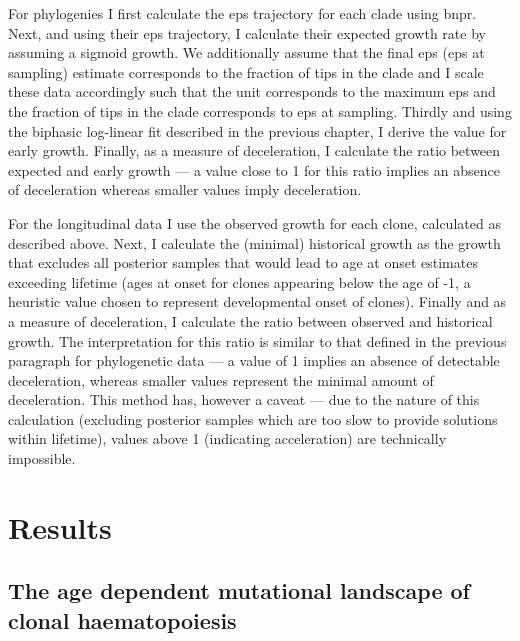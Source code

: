 For phylogenies I first calculate the \ac{eps} trajectory for each clade using \ac{bnpr}. Next, and using their \ac{eps} trajectory, I calculate their expected growth rate by assuming a sigmoid growth. We additionally assume that the final \ac{eps} (\ac{eps} at sampling) estimate corresponds to the fraction of tips in the clade and I scale these data accordingly such that the unit corresponds to the maximum \ac{eps} and the fraction of tips in the clade corresponds to \ac{eps} at sampling. Thirdly and using the biphasic log-linear fit described in the previous chapter, I derive the value for early growth. Finally, as a measure of deceleration, I calculate the ratio between expected and early growth --- a value close to 1 for this ratio implies an absence of deceleration whereas smaller values imply deceleration. 

For the longitudinal data I use the observed growth for each clone, calculated as described above. Next, I calculate the (minimal) historical growth as the growth that excludes all posterior samples that would lead to age at onset estimates exceeding lifetime (ages at onset for clones appearing below the age of -1, a heuristic value chosen to represent developmental onset of clones). Finally and as a measure of deceleration, I calculate the ratio between observed and historical growth. The interpretation for this ratio is similar to that defined in the previous paragraph for phylogenetic data --- a value of 1 implies an absence of detectable deceleration, whereas smaller values represent the minimal amount of deceleration. This method has, however a caveat --- due to the nature of this calculation (excluding posterior samples which are too slow to provide solutions within lifetime), values above 1 (indicating acceleration) are technically impossible. 

\section{Results}

\subsection{The age dependent mutational landscape of clonal haematopoiesis}

